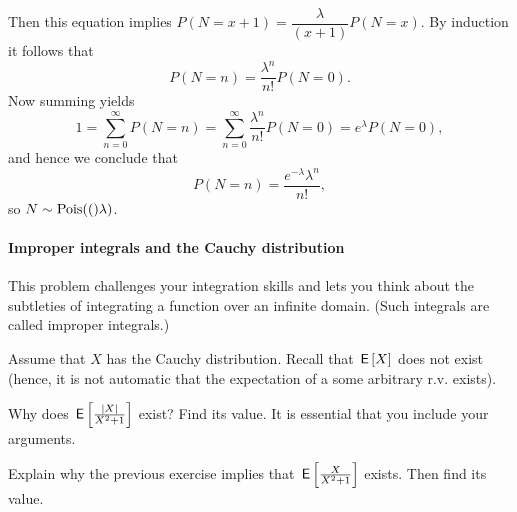 \documentclass[../../assignments/assignments]{subfiles}
\begin{document}
\begin{exercise}
{\begin{solution}
 Then this equation implies $P(N=x+1) = \dfrac{\lambda}{(x+1)} P(N=x)$. By induction it follows that $$P(N = n) = \frac{\lambda^n}{n!} P(N=0).$$
 Now summing yields $$1 = \sum_{n=0}^\infty P(N=n) = \sum_{n=0}^\infty \frac{\lambda^n}{n!} P(N = 0) = e^{\lambda} P(N=0),$$
and hence we conclude that
$$P(N = n) = \frac{e^{-\lambda}\lambda^n}{n!},$$
so $N \sim \mathrm{Pois}(()\lambda)$.
\end{solution}
}
\end{exercise}



\paragraph{Improper integrals and the Cauchy distribution}

This problem challenges your integration skills and lets you think about the subtleties of integrating a function over an infinite domain.
(Such integrals are called improper integrals.)

Assume that $X$ has the Cauchy distribution.
Recall that $\,\mathsf{E}\left[X\right]$ does not exist (hence, it is not automatic that the expectation of a some arbitrary r.v.
exists).
\begin{exercise}
Why does $\,\mathsf{E}\left[\frac{|X|}{X^2+1}\right]$ exist? Find its value. It is essential that you include your arguments.
\end{exercise}


\begin{exercise}
Explain why the previous exercise implies that $\,\mathsf{E}\left[\frac{X}{X^2+1}\right]$ exists. Then find its value.
\end{exercise}
\end{document}
